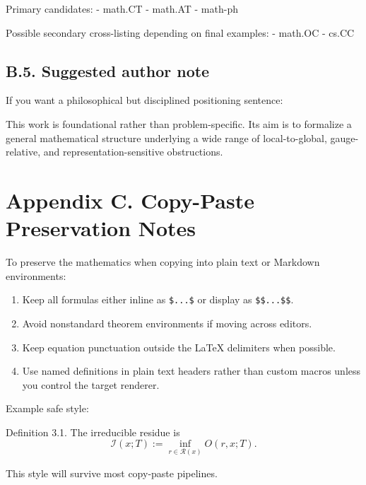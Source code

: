 \documentclass[
]{article}
\providecommand{\tightlist}{%
  \setlength{\itemsep}{0pt}\setlength{\parskip}{0pt}}
\begin{document}
Primary candidates: - math.CT - math.AT - math-ph

Possible secondary cross-listing depending on final examples: - math.OC
- cs.CC

\subsection{B.5. Suggested author
note}\label{b.5.-suggested-author-note}

If you want a philosophical but disciplined positioning sentence:

This work is foundational rather than problem-specific. Its aim is to
formalize a general mathematical structure underlying a wide range of
local-to-global, gauge-relative, and representation-sensitive
obstructions.

\section{Appendix C. Copy-Paste Preservation
Notes}\label{appendix-c.-copy-paste-preservation-notes}

To preserve the mathematics when copying into plain text or Markdown
environments:

\begin{enumerate}
\def\labelenumi{\arabic{enumi}.}
\tightlist
\item
  Keep all formulas either inline as \texttt{\$...\$} or display as
  \texttt{\$\$...\$\$}.
\item
  Avoid nonstandard theorem environments if moving across editors.
\item
  Keep equation punctuation outside the LaTeX delimiters when possible.
\item
  Use named definitions in plain text headers rather than custom macros
  unless you control the target renderer.
\end{enumerate}

Example safe style:

Definition 3.1. The irreducible residue is \[
\mathcal{I}(x;T) := \inf_{r \in \mathcal{R}(x)} O(r,x;T).
\]

This style will survive most copy-paste pipelines.
\end{document}
